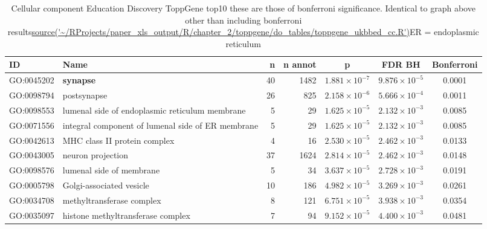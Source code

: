 \begin{table}[ht]
\centering
\begin{adjustbox}{width=\textwidth}

\begin{tabular}{llrrccc}
  \hline
ID & Name & n & n annot & p & FDR BH & Bonferroni \\ 
  \hline
GO:0045202 & \textbf{synapse} & 40 & 1482 & $1.881 \times 10^{-7}$ & $9.876 \times 10^{-5}$ & 0.0001 \\ 
  GO:0098794 & postsynapse & 26 & 825 & $2.158 \times 10^{-6}$ & $5.666 \times 10^{-4}$ & 0.0011 \\ 
  GO:0098553 & lumenal side of endoplasmic reticulum membrane & 5 & 29 & $1.625 \times 10^{-5}$ & $2.132 \times 10^{-3}$ & 0.0085 \\ 
  GO:0071556 & integral component of lumenal side of ER membrane & 5 & 29 & $1.625 \times 10^{-5}$ & $2.132 \times 10^{-3}$ & 0.0085 \\ 
  GO:0042613 & MHC class II protein complex & 4 & 16 & $2.530 \times 10^{-5}$ & $2.462 \times 10^{-3}$ & 0.0133 \\ 
  GO:0043005 & neuron projection & 37 & 1624 & $2.814 \times 10^{-5}$ & $2.462 \times 10^{-3}$ & 0.0148 \\ 
  GO:0098576 & lumenal side of membrane & 5 & 34 & $3.637 \times 10^{-5}$ & $2.728 \times 10^{-3}$ & 0.0191 \\ 
  GO:0005798 & Golgi-associated vesicle & 10 & 186 & $4.982 \times 10^{-5}$ & $3.269 \times 10^{-3}$ & 0.0261 \\ 
  GO:0034708 & methyltransferase complex & 8 & 121 & $6.751 \times 10^{-5}$ & $3.938 \times 10^{-3}$ & 0.0354 \\ 
  GO:0035097 & histone methyltransferase complex & 7 & 94 & $9.152 \times 10^{-5}$ & $4.400 \times 10^{-3}$ & 0.0481 \\ 
   \hline
\end{tabular}
\end{adjustbox}
\caption{Cellular component Education Discovery ToppGene top10 these are those of bonferroni significance. Identical to graph above other than including bonferroni  results\url{source('~/RProjects/paper_xls_output/R/chapter_2/toppgene/do_tables/toppgene_ukbbed_cc.R')}ER = endoplasmic reticulum}
\label{tab:Cellular component Education Discovery ToppGene top10 results Bonfe}
\end{table}

